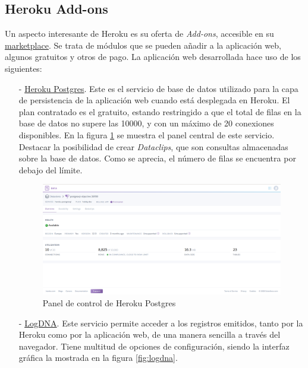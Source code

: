 \documentclass[a4paper]{article}
\begin{document}
    \subsection{Heroku Add-ons} \label{sec:addons}
    Un aspecto interesante de Heroku es su oferta de \emph{Add-ons}, accesible en su \href{https://elements.heroku.com/addons}{marketplace}. Se trata de módulos que se pueden añadir a la aplicación web, algunos gratuitos y otros de pago. La aplicación web desarrollada hace uso de los siguientes:
    
    \begin{itemize}
       	\item[-] \href{https://elements.heroku.com/addons/heroku-postgresql}{Heroku Postgres}. Este es el servicio de base de datos utilizado para la capa de persistencia de la aplicación web cuando está desplegada en Heroku. El plan contratado es el gratuito, estando restringido a que el total de filas en la base de datos no supere las 10000, y con un máximo de 20 conexiones disponibles. En la figura \ref{fig:herokupostgres} se muestra el panel central de este servicio. Destacar la posibilidad de crear \emph{Dataclips}, que son consultas almacenadas sobre la base de datos. Como se aprecia, el número de filas se encuentra por debajo del límite.
       	
       	\begin{figure}[hbt!]
       		\centering
       		\includegraphics[width=\textwidth,keepaspectratio]{herokupostgres}
       		\caption{Panel de control de Heroku Postgres}
       		\label{fig:herokupostgres}
       	\end{figure}
       	
       	\item[-] \href{https://elements.heroku.com/addons/logdna}{LogDNA}. Este servicio permite acceder a los registros emitidos, tanto por la Heroku como por la aplicación web, de una manera sencilla a través del navegador. Tiene multitud de opciones de configuración, siendo la interfaz gráfica la mostrada en la figura \ref{fig:logdna}.
       	

\end{itemize}
\end{document}
